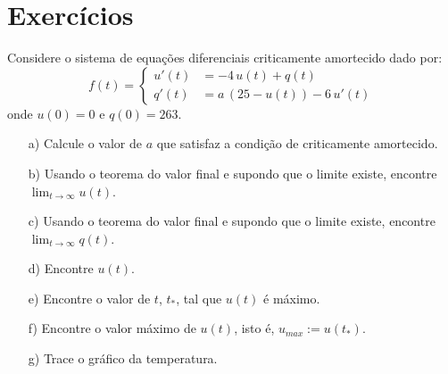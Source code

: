 \section*{Exercícios}
\begin{exeresol}
Considere o sistema de equações diferenciais criticamente amortecido dado por:
$$
f(t) = 
\begin{cases}
u'(t) & = -4\,u(t)+q(t) \\
q'(t) &= a\,(25-u(t))-6\,u'(t)
\end{cases}
$$
onde $u(0) = 0$ e $q(0) = 263$. 
\begin{itemize}
 \item[a)] Calcule o valor de $a$ que satisfaz a condição de criticamente amortecido.
 \item[b)] Usando o teorema do valor final e supondo que o limite existe, encontre $\displaystyle\lim_{t \to \infty} u(t)$.
 \item[c)]  Usando o teorema do valor final e supondo que o limite existe, encontre  $\displaystyle\lim_{t \to \infty} q(t)$.
 \item[d)] Encontre $u(t)$.
 \item[e)] Encontre o valor de $t$, $t_\ast$, tal que $u(t)$ é máximo.
 \item[f)] Encontre o valor máximo de $u(t)$, isto é, $u_{max}:=u(t_\ast)$.
 \item[g)] Trace o gráfico da temperatura.
\end{itemize}
\end{exeresol}
